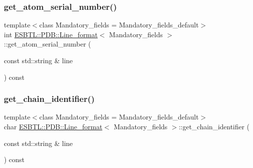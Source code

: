\subsubsection{\texorpdfstring{get\+\_\+atom\+\_\+serial\+\_\+number()}{get\_atom\_serial\_number()}}
{\footnotesize\ttfamily template$<$class Mandatory\+\_\+fields  = Mandatory\+\_\+fields\+\_\+default$>$ \\
int \hyperlink{classESBTL_1_1PDB_1_1Line__format}{E\+S\+B\+T\+L\+::\+P\+D\+B\+::\+Line\+\_\+format}$<$ Mandatory\+\_\+fields $>$\+::get\+\_\+atom\+\_\+serial\+\_\+number (\begin{DoxyParamCaption}\item[{const std\+::string \&}]{line }\end{DoxyParamCaption}) const\hspace{0.3cm}{\ttfamily [inline]}}

\mbox{\label{classESBTL_1_1PDB_1_1Line__format_a2db4604a71b9299ec3696d46d1a159bc}} 
\subsubsection{\texorpdfstring{get\+\_\+chain\+\_\+identifier()}{get\_chain\_identifier()}}
{\footnotesize\ttfamily template$<$class Mandatory\+\_\+fields  = Mandatory\+\_\+fields\+\_\+default$>$ \\
char \hyperlink{classESBTL_1_1PDB_1_1Line__format}{E\+S\+B\+T\+L\+::\+P\+D\+B\+::\+Line\+\_\+format}$<$ Mandatory\+\_\+fields $>$\+::get\+\_\+chain\+\_\+identifier (\begin{DoxyParamCaption}\item[{const std\+::string \&}]{line }\end{DoxyParamCaption}) const\hspace{0.3cm}{\ttfamily [inline]}}

\mbox{\label{classESBTL_1_1PDB_1_1Line__format_a314acf4e8c390b306beb7fd917e0da31}} 
